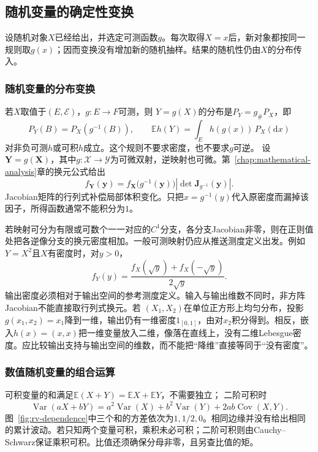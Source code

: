 \subsection{随机变量的确定性变换}
设随机对象\(X\)已经给出，并选定可测函数\(g\)。每次取得\(X=x\)后，新对象都按同一规则取\(g(x)\)；因而变换没有增加新的随机抽样。结果的随机性仍由\(X\)的分布传入。

\subsubsection{随机变量的分布变换}
\label{sec:rv-pushforward}
若\(X\)取值于\((E,\mathcal E)\)，\(g:E\to F\)可测，则
\(Y=g(X)\)的分布是\(P_Y=g_\#P_X\)，即
\[
P_Y(B)=P_X(g^{-1}(B)),\qquad
\mathbb E h(Y)=\int_E h(g(x))\,P_X(\mathrm dx)
\]
对非负可测\(h\)或可积\(h\)成立。这个规则不要求密度，也不要求\(g\)可逆。
设\(\bm{Y}=g(\bm{X})\)，其中\(g:\mathcal{X}\to\mathcal{Y}\)为可微双射，逆映射也可微。第~\ref{chap:mathematical-analysis}章的换元公式给出
\begin{equation}
  f_{\bm{Y}}(\bm{y})
  =
  f_{\bm{X}}\bigl(g^{-1}(\bm{y})\bigr)
  \left|
    \det\bm{J}_{g^{-1}}(\bm{y})
  \right|.
  \label{eq:probability-density-change-variables}
\end{equation}
Jacobian矩阵的行列式补偿局部体积变化。只把\(x=g^{-1}(y)\)代入原密度而漏掉该因子，所得函数通常不能积分为\(1\)。

若映射可分为有限或可数个一一对应的\(C^1\)分支，各分支Jacobian非零，则在正则值处把各逆像分支的换元密度相加。一般可测映射仍应从推送测度定义出发。例如\(Y=X^2\)且\(X\)有密度时，对\(y>0\)，
\[ f_Y(y)
  =\frac{f_X(\sqrt{y})+f_X(-\sqrt{y})}{2\sqrt{y}}. \]
输出密度必须相对于输出空间的参考测度定义。输入与输出维数不同时，非方阵Jacobian不能直接取行列式换元。若
\((X_1,X_2)\)在单位正方形上均匀分布，投影\(g(x_1,x_2)=x_1\)降到一维，输出仍有一维密度\(1_{[0,1]}\)，由对\(x_2\)积分得到。相反，嵌入\(h(x)=(x,x)\)把一维变量放入二维，像落在直线上，没有二维Lebesgue密度。应比较输出支持与输出空间的维数，而不能把“降维”直接等同于“没有密度”。

\subsubsection{数值随机变量的组合运算}
\label{sec:rv-combinations}
可积变量的和满足\(\mathbb E(X+Y)=\mathbb EX+\mathbb EY\)，不需要独立；
二阶可积时
\[
\operatorname{Var}(aX+bY)
=a^2\operatorname{Var}(X)+b^2\operatorname{Var}(Y)
 +2ab\operatorname{Cov}(X,Y).
\]
图~\ref{fig:rv-dependence}中三个和的方差依次为\(1,1/2,0\)。相同边缘并没有给出相同的累计波动。若只知两个变量可积，乘积未必可积；二阶可积则由Cauchy--Schwarz保证乘积可积。比值还须确保分母非零，且另查比值的矩。

